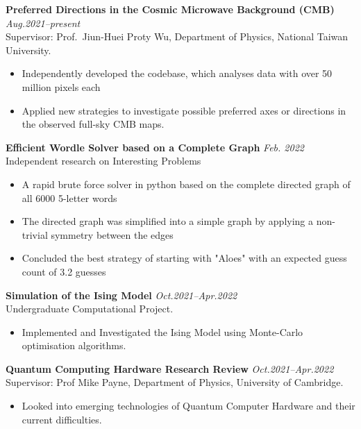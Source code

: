 \documentclass[11pt,a4paper,roman]{moderncv}        %
\begin{document}
\textbf{Preferred Directions in the Cosmic Microwave Background (CMB)} \hfill \textit{Aug.2021--present}
\vspace*{1mm}\\
{Supervisor: Prof.\ Jiun-Huei Proty Wu, Department of Physics, National Taiwan University.}
\vspace*{1mm}
\begin{itemize}
	\item Independently developed the codebase, which analyses data with over 50 million pixels each
	\item Applied new strategies to investigate possible preferred axes or directions in the observed full-sky CMB maps.\\
\end{itemize}

\textbf{Efficient Wordle Solver based on a Complete Graph} \hfill \textit{Feb. 2022} 
\vspace*{1mm}\\
{Independent research on Interesting Problems}
\vspace*{1mm}
\begin{itemize}
	\item A rapid brute force solver in python based on the complete directed graph of all 6000 5-letter words 
	\item The directed graph was simplified into a simple graph by applying a non-trivial symmetry between the edges
	\item Concluded the best strategy of starting with "Aloes" with an expected guess count of 3.2 guesses\\
\end{itemize}

\textbf{Simulation of the Ising Model} \hfill \textit{Oct.2021--Apr.2022} 
\vspace*{1mm}\\ 
{Undergraduate Computational Project.}
\vspace*{1mm}
\begin{itemize}
	\item Implemented and Investigated the Ising Model using Monte-Carlo optimisation algorithms.\\
\end{itemize}

\textbf{Quantum Computing Hardware Research Review} \hfill \textit{Oct.2021--Apr.2022}
\vspace*{1mm}\\
{Supervisor: Prof Mike Payne, Department of Physics, University of Cambridge.}
\vspace*{1mm}
\begin{itemize}
    \item Looked into emerging technologies of Quantum Computer Hardware and their current difficulties.\\
\end{itemize}
\end{document}
